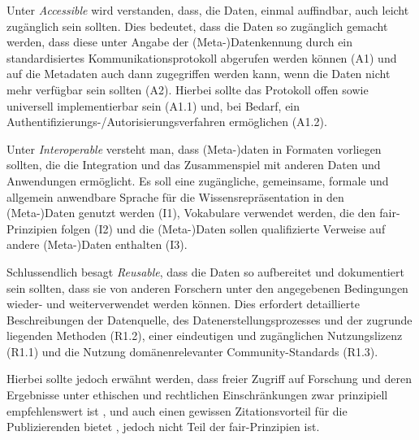Unter \textit{Accessible} wird verstanden, dass, die Daten, einmal auffindbar, auch leicht zugänglich sein sollten.
Dies bedeutet, dass die Daten so zugänglich gemacht werden, dass diese unter Angabe der (Meta-)Datenkennung durch ein standardisiertes Kommunikationsprotokoll abgerufen werden können (A1) und auf die Metadaten auch dann zugegriffen werden kann, wenn die Daten nicht mehr verfügbar sein sollten (A2).
Hierbei sollte das Protokoll offen sowie universell implementierbar sein (A1.1) und, bei Bedarf, ein Authentifizierungs-/Autorisierungsverfahren ermöglichen (A1.2).

Unter \textit{Interoperable} versteht man, dass (Meta-)daten in Formaten vorliegen sollten, die die Integration und das Zusammenspiel mit anderen Daten und Anwendungen ermöglicht.
Es soll eine zugängliche, gemeinsame, formale und allgemein anwendbare Sprache für die Wissensrepräsentation in den (Meta-)Daten genutzt werden (I1), Vokabulare verwendet werden, die den \gls{fair}-Prinzipien folgen (I2) und die (Meta-)Daten sollen qualifizierte Verweise auf andere (Meta-)Daten enthalten (I3).

Schlussendlich besagt \textit{Reusable}, dass die Daten so aufbereitet und dokumentiert sein sollten, dass sie von anderen Forschern unter den angegebenen Bedingungen wieder- und weiterverwendet werden können.
Dies erfordert detaillierte Beschreibungen der Datenquelle, des Datenerstellungsprozesses und der zugrunde liegenden Methoden (R1.2), einer eindeutigen und zugänglichen Nutzungslizenz (R1.1) und die Nutzung domänenrelevanter Community-Standards (R1.3).

Hierbei sollte jedoch erwähnt werden, dass freier Zugriff auf Forschung und deren Ergebnisse unter ethischen und rechtlichen Einschränkungen zwar prinzipiell empfehlenswert ist \autocite{Hopf2022}, und auch einen gewissen Zitationsvorteil für die Publizierenden bietet \autocite{Piwowar2013-DataReuse,Bautista-Puig2020}, jedoch nicht Teil der \gls{fair}-Prinzipien ist.

